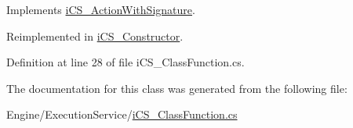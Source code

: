 Implements \hyperlink{classi_c_s___action_with_signature_ab62366545f5e9079753a1292a3a76354}{i\+C\+S\+\_\+\+Action\+With\+Signature}.



Reimplemented in \hyperlink{classi_c_s___constructor_aa982a0b1a6338a2f317256100a8e0d8a}{i\+C\+S\+\_\+\+Constructor}.



Definition at line 28 of file i\+C\+S\+\_\+\+Class\+Function.\+cs.



The documentation for this class was generated from the following file\+:\begin{DoxyCompactItemize}
\item 
Engine/\+Execution\+Service/\hyperlink{i_c_s___class_function_8cs}{i\+C\+S\+\_\+\+Class\+Function.\+cs}\end{DoxyCompactItemize}
